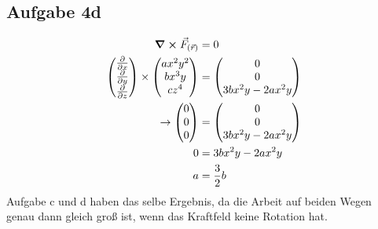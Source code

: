\documentclass[a4paper,10pt]{extarticle}
\begin{document}
\subsection*{Aufgabe 4d}
\begin{align*}
\curl \vec{F}_{(\vec{r})} &= 0 \\
\mqty( \pdv{}{x} \\ \pdv{}{y} \\ \pdv{}{z}) \times \mqty(ax^2y^2 \\ bx^3y \\ cz^4) &= \mqty(0 \\ 0 \\ 3bx^2y - 2ax^2y) \\
\rightarrow \mqty(0 \\ 0 \\ 0) &= \mqty(0 \\ 0 \\ 3bx^2y - 2ax^2y) \\
0 &= 3bx^2y - 2ax^2y \\
a &= \frac{3}{2}b
\end{align*}
Aufgabe c und d haben das selbe Ergebnis, da die Arbeit auf beiden Wegen genau dann gleich groß ist, wenn das Kraftfeld keine Rotation hat.
\end{document}

